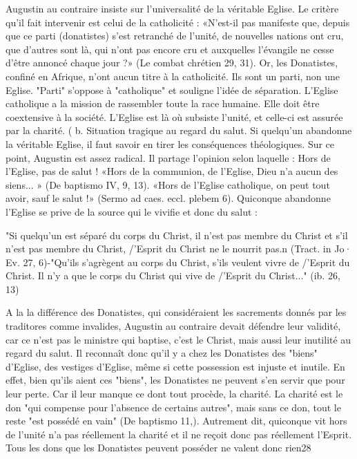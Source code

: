  	Augustin au contraire insiste sur l'universalité de la véritable Eglise. Le critère qu'il fait intervenir est celui de la catholicité : «N'est-il pas manifeste que, depuis que ce parti (donatistes) s'est retranché de l'unité, de nouvelles nations ont cru, que d'autres sont là, qui n'ont pas encore cru et auxquelles l'évangile ne cesse d'être annoncé chaque jour ?» (Le combat chrétien 29, 31). Or, les Donatistes, confiné en Afrique, n'ont aucun titre à la catholicité. Ils sont un parti, non une Eglise. "Parti" s'oppose à "catholique" et souligne l'idée de séparation. L'Eglise catholique a la
mission de rassembler toute la race humaine. Elle doit  être coextensive à la société.
L'Eglise est là où subsiste l'unité, et celle-ci est assurée par la charité.	(
b.	Situation  tragique au regard du salut.  Si quelqu'un abandonne la véritable Eglise, il faut savoir en tirer les conséquences théologiques. Sur ce point, Augustin est assez radical. Il partage l'opinion selon laquelle : Hors de l'Eglise, pas de salut ! «Hors de la communion, de l'Eglise, Dieu n'a aucun des siens... » (De baptismo IV, 9, 13). «Hors de l'Eglise catholique, on peut tout avoir, sauf le salut !» (Sermo ad caes. eccl. plebem 6). Quiconque abandonne l'Eglise se prive de la source qui le vivifie et donc du salut :

"Si quelqu'un est séparé du corps du Christ, il n'est pas membre du Christ et s'il n'est pas membre du Christ, /'Esprit du Christ ne le nourrit pas.n  (Tract. in Jo· Ev. 27, 6)-"Qu'ils s'agrègent au corps du Christ, s'ils veulent vivre de /'Esprit du Christ. Il n'y a que le corps du Christ qui vive de /'Esprit du Christ..." (ib. 26, 13)

A la la différence des Donatistes, qui considéraient les sacrements donnés par les traditores comme invalides, Augustin au contraire devait défendre leur validité, car ce n'est pas le ministre qui baptise, c'est le Christ, mais aussi leur inutilité au regard du salut. Il reconnaît donc qu'il y a chez les Donatistes des "biens" d'Eglise, des vestiges d'Eglise, même si cette possession est injuste et inutile. En effet, bien qu'ils aient ces "biens", les Donatistes ne peuvent s'en servir que pour leur perte. Car il leur manque ce dont tout procède, la charité. La charité est le don "qui compense pour l'absence de certains autres", mais sans ce don, tout le reste "est possédé en vain" (De baptismo 11,). Autrement dit, quiconque vit hors de l'unité n'a pas réellement la charité et il ne reçoit donc pas réellement l'Esprit. Tous les dons que les Donatistes peuvent posséder
ne valent donc rien28



